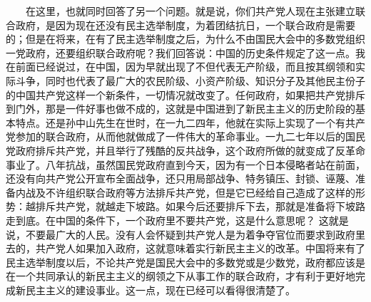 \documentclass[cn,11pt,chinese]{elegantbook}
\begin{document}
　　在这里，也就同时回答了另一个问题。就是说，你们共产党人现在主张建立联合政府，是因为现在还没有民主选举制度，为着团结抗日，一个联合政府是需要的；但是在将来，在有了民主选举制度之后，为什么不由国民大会中的多数党组织一党政府，还要组织联合政府呢？我们回答说：中国的历史条件规定了这一点。我在前面已经说过，在中国，因为早就出现了不但代表无产阶级，而且按其纲领和实际斗争，同时也代表了最广大的农民阶级、小资产阶级、知识分子及其他民主份子的中国共产党这样一个新条件，一切情况就改变了。任何政府，如果把共产党排斥到门外，那是一件好事也做不成的，这就是中国进到了新民主主义的历史阶段的基本特点。还是孙中山先生在世时，在一九二四年，他就在实际上实现了一个有共产党参加的联合政府，从而他就做成了一件伟大的革命事业。一九二七年以后的国民党政府排斥共产党，并且举行了残酷的反共战争，这个政府所做的就变成了反革命事业了。八年抗战，虽然国民党政府直到今天，因为有一个日本侵略者站在前面，还没有向共产党公开宣布全面战争，还只用局部战争、特务镇压、封锁、诬蔑、准备内战及不许组织联合政府等方法排斥共产党，但是它已经给自己造成了这样的形势：越排斥共产党，就越走下坡路。如果今后还要排斥下去，那就是准备将下坡路走到底。在中国的条件下，一个政府里不要共产党，这是什么意思呢？ 这就是说，不要最广大的人民。没有人会怀疑到共产党人是为着争夺官位而要求到政府里去的，共产党人如果加入政府，这就意味着实行新民主主义的改革。中国将来有了民主选举制度以后，不论共产党是国民大会中的多数党或是少数党，政府都应该是在一个共同承认的新民主主义的纲领之下从事工作的联合政府，才有利于更好地完成新民主主义的建设事业。这一点，现在已经可以看得很清楚了。\\
\end{document}
